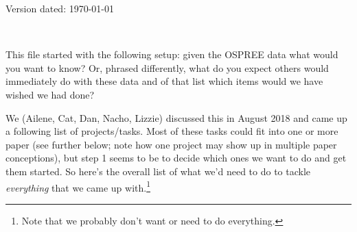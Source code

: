 \documentclass[11pt,letterpaper]{article}
\begin{document}
\begin{flushright}
Version dated: \today
\end{flushright}
\thispagestyle{empty}
\bigskip
\medskip
\begin{center}
\\
\vspace{2ex}
\bigskip
\end{center}

This file started with the following setup: given the OSPREE data what would you want to know? Or, phrased differently, what do you expect others would immediately do with these data and of that list which items would we have wished we had done? 

We (Ailene, Cat, Dan, Nacho, Lizzie) discussed this in August 2018 and came up a following list of projects/tasks. Most of these tasks could fit into one or more paper (see further below; note how one project may show up in multiple paper conceptions), but step 1 seems to be to decide which ones we want to do and get them started. So here's the overall list of what we'd need to do to tackle \emph{everything} that we came up with.\footnote{Note that we probably don't want or need to do everything.}
\end{document}
